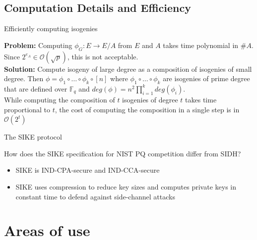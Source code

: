 \documentclass[handout]{beamer}
\begin{document}
\subsection{Computation Details and Efficiency}

\begin{frame}{Efficiently computing isogenies}


	\textbf{Problem:} Computing $\phi_G : E \to E/A$ from $E$ and $A$ takes time polynomial in $\#A$. Since $2^{e_A} \in \mathcal{O}(\sqrt{p})$, this is not acceptable.\pause\\
	\vfill
	\textbf{Solution:} Compute isogeny of large degree as a composition of isogenies of small degree. Then $\phi = \phi_1 \circ \dots \circ \phi_k \circ [n]$ where $\phi_1 \circ \dots \circ \phi_k$ are isogenies of prime degree that are defined over $\mathbb{F}_q$ and $deg(\phi) = n^2 \prod^k_{i=1} deg(\phi_i)$.\\
	 While computing the composition of $t$ isogenies of degree $t$ takes time proportional to $t$, the cost of computing the composition in a single step is in $\mathcal{O}(2^t)$\\
	 

\end{frame}
\begin{frame}{The SIKE protocol}

How does the SIKE specification for NIST PQ competition differ from SIDH?

\begin{itemize}[\textbullet]
	\item SIKE is IND-CPA-secure and IND-CCA-secure %
	\item SIKE uses compression to reduce key sizes and computes private keys in constant time to defend against side-channel attacks
\end{itemize}

\end{frame}
\section{Areas of use}
\end{document}
